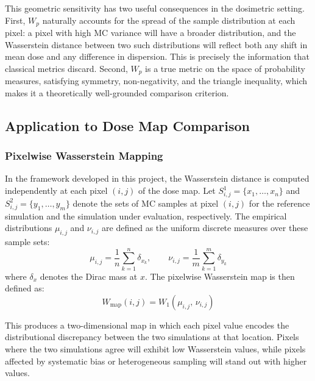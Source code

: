 \documentclass[12pt]{article}
\begin{document}
This geometric sensitivity has two useful consequences in the dosimetric setting.
First, $W_p$ naturally accounts for the spread of the sample distribution at each
pixel: a pixel with high MC variance will have a broader distribution, and the
Wasserstein distance between two such distributions will reflect both any shift in
mean dose and any difference in dispersion. This is precisely the information that
classical metrics discard. Second, $W_p$ is a true metric on the space of probability
measures, satisfying symmetry, non-negativity, and the triangle inequality, which
makes it a theoretically well-grounded comparison criterion.

\subsection{Application to Dose Map Comparison}

\subsubsection{Pixelwise Wasserstein Mapping}

In the framework developed in this project, the Wasserstein distance is computed
independently at each pixel $(i, j)$ of the dose map. Let
$S^1_{i,j} = \{x_1, \ldots, x_n\}$ and $S^2_{i,j} = \{y_1, \ldots, y_m\}$ denote
the sets of MC samples at pixel $(i,j)$ for the reference simulation and the
simulation under evaluation, respectively. The empirical distributions $\mu_{i,j}$
and $\nu_{i,j}$ are defined as the uniform discrete measures over these sample sets:
\begin{equation}
    \mu_{i,j} = \frac{1}{n} \sum_{k=1}^{n} \delta_{x_k}, \qquad
    \nu_{i,j} = \frac{1}{m} \sum_{k=1}^{m} \delta_{y_k}
\end{equation}
where $\delta_x$ denotes the Dirac mass at $x$. The pixelwise Wasserstein map is
then defined as:
\begin{equation}
    W_{\text{map}}(i,j) = W_1\!\left(\mu_{i,j},\, \nu_{i,j}\right)
\end{equation}

This produces a two-dimensional map in which each pixel value encodes the
distributional discrepancy between the two simulations at that location. Pixels where
the two simulations agree will exhibit low Wasserstein values, while pixels affected
by systematic bias or heterogeneous sampling will stand out with higher values.
\end{document}
